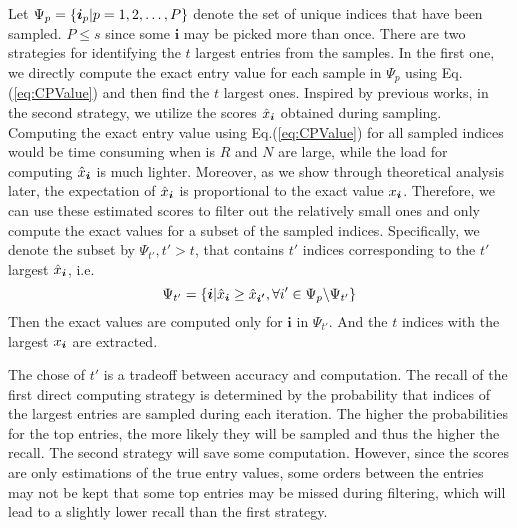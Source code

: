 \documentclass[letterpaper]{article}
\newcommand{\V}[1]{{\boldsymbol{{\MakeLowercase{#1}}}}}
\newcommand{\Eqn}[1]   {Eq.(\ref{eq:#1})}
\newcommand{\predx}{\hat{x}_{\V{i}}}
\begin{document}
Let $\Psi_p = \{\V{i}_p|p = 1,2,\ldots,P\}$ 
denote the set of unique indices that have been sampled. 
$P\leq s$ since some $\boldsymbol{i}$ may be picked more than once. 
There are two strategies for identifying the $t$ largest entries from the samples. 
In the first one, 
we directly compute the exact entry value for each sample in $\Psi_{p}$ using \Eqn{CPValue}
and then find the $t$ largest ones. 
Inspired by previous works, in the second strategy, 
we utilize the scores $\predx$ obtained during sampling. 
Computing the exact entry value using \Eqn{CPValue} for all sampled indices 
would be time consuming when is $R$ and $N$ are large, 
while the load for computing $\predx$ is much lighter. 
Moreover, as we show through theoretical analysis later, 
the expectation of $\predx$ is proportional to the exact value $x_{\V{i}}$. 
Therefore, we can use these estimated scores to filter out the relatively small ones 
and only compute the exact values for a subset of the sampled indices. 
Specifically, we denote the subset by $\Psi_{t'},t'>t$, 
that contains $t'$ indices corresponding to the $t'$ largest $\predx$, i.e.
\[
    \Psi_{t'} = \{ \V{i} | \predx \geq \hat{x}_{\V{i'}},
                           \forall i'\in \Psi_{p} \backslash \Psi_{t'}
                \}
\] 
Then the exact values  are computed only for $\boldsymbol{i}$ in $\Psi_{t'}$. 
And the $t$ indices with the largest $x_{\V{i}}$ are extracted.

The chose of $t'$ is a tradeoff between accuracy and computation. 
The recall of the first direct computing strategy is determined by the probability 
that indices of the largest entries are sampled during each iteration. 
The higher the probabilities for the top entries, the more likely they will be sampled 
and thus the higher the recall. 
The second strategy will save some computation. 
However, since the scores are only estimations of the true entry values, 
some orders between the entries may not be kept 
that some top entries may be missed during filtering, 
which will lead to a slightly lower recall than the first strategy.
\end{document}
